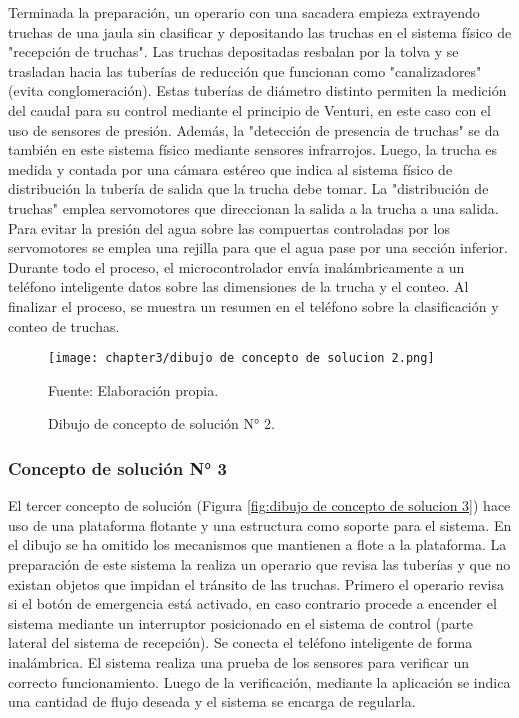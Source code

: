 Terminada la preparación, un operario con una sacadera empieza extrayendo truchas de una jaula sin clasificar y depositando las truchas en el sistema físico de "recepción de truchas". Las truchas depositadas resbalan por la tolva y se trasladan hacia las tuberías de reducción que funcionan como "canalizadores" (evita conglomeración). Estas tuberías de diámetro distinto permiten la medición del caudal para su control mediante el principio de Venturi, en este caso con el uso de sensores de presión. Además, la "detección de presencia de truchas" se da también en este sistema físico mediante sensores infrarrojos. Luego, la trucha es medida y contada por una cámara estéreo que indica al sistema físico de distribución la tubería de salida que la trucha debe tomar. La "distribución de truchas" emplea servomotores que direccionan la salida a la trucha a una salida. Para evitar la presión del agua sobre las compuertas controladas por los servomotores se emplea una rejilla para que el agua pase por una sección inferior. 
Durante todo el proceso, el microcontrolador envía inalámbricamente a un teléfono inteligente datos sobre las dimensiones de la trucha y el conteo. Al finalizar el proceso, se muestra un resumen en el teléfono sobre la clasificación y conteo de truchas.

\begin{figure}[H]
	\centering
	\texttt{[image: chapter3/dibujo de concepto de solucion 2.png]}
	\caption{Dibujo de concepto de solución N° 2.}
	Fuente: Elaboración propia.
	\label{fig:dibujo de concepto de solucion 2}
\end{figure}

\subsubsection{Concepto de solución N° 3}

El tercer concepto de solución (Figura \ref{fig:dibujo de concepto de solucion 3}) hace uso de una plataforma flotante y una estructura como soporte para el sistema. En el dibujo se ha omitido los mecanismos que mantienen a flote a la plataforma. La preparación de este sistema la realiza un operario que revisa las tuberías y que no existan objetos que impidan el tránsito de las truchas. Primero el operario revisa si el botón de emergencia está activado, en caso contrario procede a encender el sistema mediante un interruptor posicionado en el sistema de control (parte lateral del sistema de recepción). Se conecta el teléfono inteligente de forma inalámbrica. El sistema realiza una prueba de los sensores para verificar un correcto funcionamiento. Luego de la verificación, mediante la aplicación se indica una cantidad de flujo deseada y el sistema se encarga de regularla.

